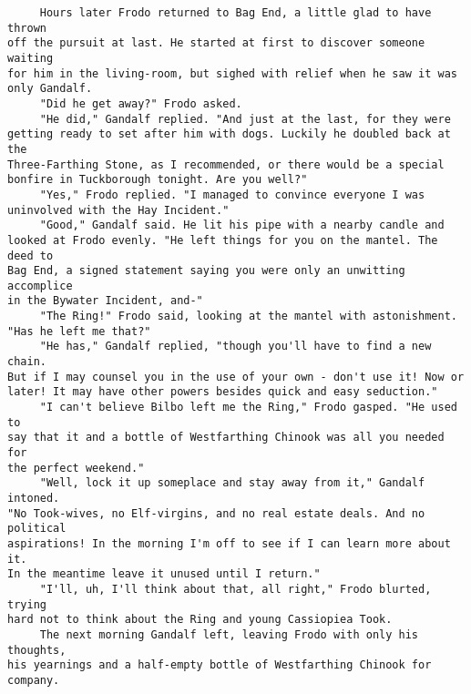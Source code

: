 \begin{verbatim}
     Hours later Frodo returned to Bag End, a little glad to have thrown 
off the pursuit at last. He started at first to discover someone waiting 
for him in the living-room, but sighed with relief when he saw it was 
only Gandalf.
     "Did he get away?" Frodo asked.
     "He did," Gandalf replied. "And just at the last, for they were 
getting ready to set after him with dogs. Luckily he doubled back at the 
Three-Farthing Stone, as I recommended, or there would be a special 
bonfire in Tuckborough tonight. Are you well?"
     "Yes," Frodo replied. "I managed to convince everyone I was 
uninvolved with the Hay Incident."
     "Good," Gandalf said. He lit his pipe with a nearby candle and 
looked at Frodo evenly. "He left things for you on the mantel. The deed to 
Bag End, a signed statement saying you were only an unwitting accomplice 
in the Bywater Incident, and-"
     "The Ring!" Frodo said, looking at the mantel with astonishment. 
"Has he left me that?"
     "He has," Gandalf replied, "though you'll have to find a new chain. 
But if I may counsel you in the use of your own - don't use it! Now or 
later! It may have other powers besides quick and easy seduction."
     "I can't believe Bilbo left me the Ring," Frodo gasped. "He used to 
say that it and a bottle of Westfarthing Chinook was all you needed for 
the perfect weekend."
     "Well, lock it up someplace and stay away from it," Gandalf intoned. 
"No Took-wives, no Elf-virgins, and no real estate deals. And no political 
aspirations! In the morning I'm off to see if I can learn more about it. 
In the meantime leave it unused until I return."
     "I'll, uh, I'll think about that, all right," Frodo blurted, trying 
hard not to think about the Ring and young Cassiopiea Took.
     The next morning Gandalf left, leaving Frodo with only his thoughts, 
his yearnings and a half-empty bottle of Westfarthing Chinook for 
company.
\end{verbatim}
